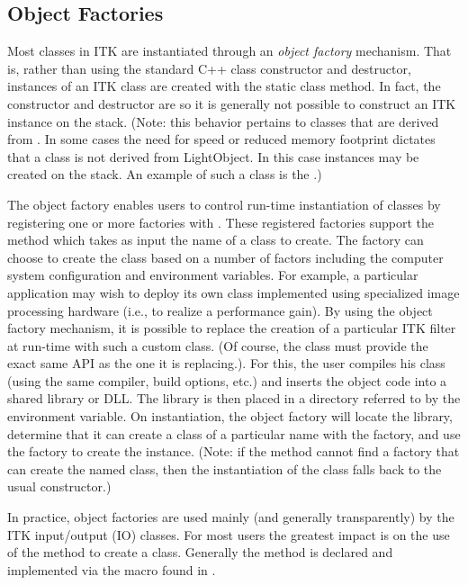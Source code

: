 \subsection{Object Factories}%
\label{sec:ObjectFactories}%
%

Most classes in ITK are instantiated through an \emph{object factory}
mechanism. That is, rather than using the standard C++ class constructor and
destructor, instances of an ITK class are created with the static class
 method. In fact, the constructor and destructor are
 so it is generally not possible to construct an ITK
instance on the stack. (Note: this behavior pertains to classes that are
derived from . In some cases the need for speed or
reduced memory footprint dictates that a class is not derived from
LightObject. In this case instances may be created on the stack. An
example of such a class is the .)

The object factory enables users to control run-time instantiation of classes
by registering one or more factories with . These
registered factories support the method 
which takes as input the name of a class to create. The factory can choose to
create the class based on a number of factors including the computer system
configuration and environment variables. For example, a particular
application may wish to deploy its own class implemented using
specialized image processing hardware (i.e., to realize a performance
gain). By using the object factory mechanism, it is possible to replace
the creation of a particular ITK filter at run-time with such a custom class.
(Of course, the class must provide the exact same API as the one it is
replacing.). For this, the user compiles his class (using the same compiler,
build options, etc.) and inserts the object code into a shared library or
DLL. The library is then placed in a directory referred to by the
 environment variable. On instantiation, the object
factory will locate the library, determine that it can create a class of a
particular name with the factory, and use the factory to create the
instance. (Note: if the  method cannot find a factory
that can create the named class, then the instantiation of the class falls
back to the usual constructor.)

In practice, object factories are used mainly (and generally transparently) by
the ITK input/output (IO) classes. For most users the greatest impact is on
the use of the  method to create a class. Generally the
 method is declared and implemented via the macro
 found in .


